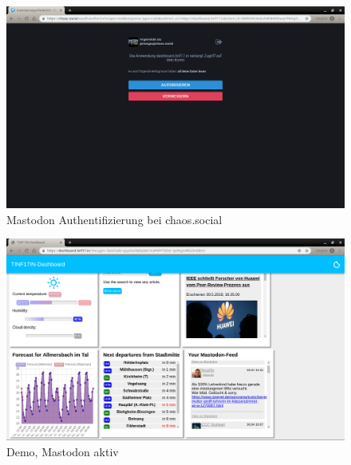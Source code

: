 \documentclass[fleqn,10pt]{SelfArx} %
\begin{document}
\begin{figure}
\includegraphics[width=\linewidth]{images/2.png}
\caption{Mastodon Authentifizierung bei chaos.social}
\label{fig:demo2}
\end{figure}

\begin{figure}
	\includegraphics[width=\linewidth]{images/3.png}
	\caption{Demo, Mastodon aktiv}
	\label{fig:demo3}
\end{figure}





\printbibliography%
\end{document}
